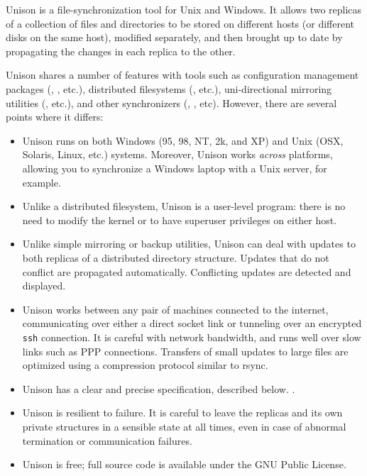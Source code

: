 Unison is a file-synchronization tool for Unix and Windows.  It allows
two replicas of a collection of files and directories to be stored on
different hosts (or different disks on the same host), modified
separately, and then brought up to date by propagating the changes in
each replica to the other.

Unison 
shares a number of features with tools such as configuration
management packages %
(,
,
etc.),
%
distributed filesystems 
(, 
etc.),
%
uni-directional mirroring utilities 
(, 
etc.),
%
and other synchronizers 
(, 
,
etc).  
%
However, there are several points where it differs:
\begin{itemize}
\item Unison runs on both Windows (95, 98, NT, 2k, and XP) and Unix (OSX, Solaris,
  Linux, etc.) systems.  Moreover, Unison works {\em across}
  platforms, allowing you to synchronize a Windows laptop with a
  Unix server, for example.
\item Unlike a distributed filesystem, Unison is a user-level program:
  there is no need to modify the kernel or to have
  superuser privileges on either host.
\item Unlike simple mirroring or backup utilities, Unison can deal
  with updates to both replicas of a distributed directory structure.
  Updates that do not conflict are propagated automatically.
  Conflicting updates are detected and displayed.
\item Unison works between any pair of machines connected to the
  internet, communicating over either a direct socket link or
  tunneling over an encrypted {\tt ssh} connection.
  It is careful with network bandwidth, and runs well over slow links
  such as PPP connections.  Transfers of small updates to large files are
  optimized using a compression protocol similar to rsync.
\item Unison has a clear and precise specification\iffull, described
below. \else. \fi
  \item Unison is resilient to failure.  It is careful to leave the
  replicas and its own private structures in a sensible state at all
  times, even in case of abnormal termination or communication
  failures.
\item Unison is free; full source code is available under the GNU
Public License.
\end{itemize}

